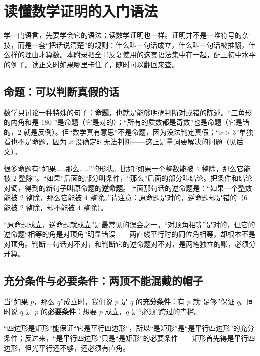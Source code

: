 \chapter{读懂数学证明的入门语法}

学一门语言，先要学会它的语法；读数学证明也一样。证明并不是一堆符号的杂技，而是一套“把话说清楚”的规则：什么叫一句话成立，什么叫一句话被推翻，什么样的理由才算数。本附录把全书反复使用的这套语法集中在一起，配上初中水平的例子。读正文时如果哪里卡住了，随时可以翻回来查。

\section{命题：可以判断真假的话}

数学只讨论一种特殊的句子：\textbf{命题}，也就是能够明确判断对或错的陈述。“三角形的内角和是 $180^\circ$”是命题（它是对的）；“所有的质数都是奇数”也是命题（它是错的，$2$ 就是反例）。但“数学真有意思”不是命题，因为没法判定真假；“$x>3$”单独看也不是命题，因为 $x$ 没确定时无法判断——这正是量词要解决的问题（见后文）。

很多命题有“如果……那么……”的形状。比如“如果一个整数能被 $4$ 整除，那么它能被 $2$ 整除”。“如果”后面的部分叫条件，“那么”后面的部分叫结论。把条件和结论对调，得到的新句子叫原命题的\textbf{逆命题}。上面那句话的逆命题是：“如果一个整数能被 $2$ 整除，那么它能被 $4$ 整除。”请注意：原命题是对的，逆命题却是错的（$6$ 能被 $2$ 整除，却不能被 $4$ 整除）。

\begin{fanli}
“原命题成立，逆命题就成立”是最常见的误会之一。“对顶角相等”是对的，但它的逆命题“相等的角是对顶角”明显错误——两直线平行时的同位角相等，却根本不是对顶角。判断一句话对不对，和判断它的逆命题对不对，是两笔独立的账，必须分开算。
\end{fanli}

\section{充分条件与必要条件：两顶不能混戴的帽子}

当“如果 $p$，那么 $q$”成立时，我们说 $p$ 是 $q$ 的\textbf{充分条件}：有 $p$ 就“足够”保证 $q$。同时说 $q$ 是 $p$ 的\textbf{必要条件}：想要 $p$ 成立，$q$ 是“必须”跨过的门槛。

\begin{li}
“四边形是矩形”能保证“它是平行四边形”，所以“是矩形”是“是平行四边形”的充分条件；反过来，“是平行四边形”只是“是矩形”的必要条件——矩形首先得是平行四边形，但光平行还不够，还必须有直角。
\end{li}

